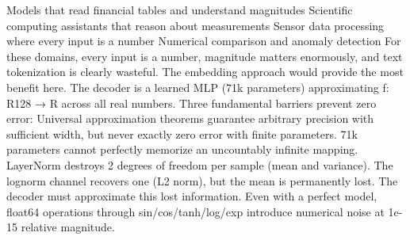 {}\markdownRendererUlBeginTight
\markdownRendererUlItem Models that read financial tables and understand magnitudes\markdownRendererUlItemEnd 
\markdownRendererUlItem Scientific computing assistants that reason about measurements\markdownRendererUlItemEnd 
\markdownRendererUlItem Sensor data processing where every input is a number\markdownRendererUlItemEnd 
\markdownRendererUlItem Numerical comparison and anomaly detection\markdownRendererUlItemEnd 
\markdownRendererUlEndTight \markdownRendererInterblockSeparator
{}For these domains, every input is a number, magnitude matters enormously, and text tokenization is clearly wasteful. The embedding approach would provide the most benefit here.\markdownRendererInterblockSeparator
{}\markdownRendererThematicBreak{}\markdownRendererInterblockSeparator
{}
\markdownRendererSectionEnd 
\markdownRendererSectionEnd \markdownRendererSectionBegin
{}\markdownRendererInterblockSeparator
{}\markdownRendererSectionBegin
{}\markdownRendererInterblockSeparator
{}The decoder is a learned MLP (71k parameters) approximating f: R\markdownRendererCircumflex{}128 → R across all real numbers. Three fundamental barriers prevent zero error:\markdownRendererInterblockSeparator
{}\markdownRendererOlBegin
{} Universal approximation theorems guarantee arbitrary precision with sufficient width, but never exactly zero error with finite parameters. 71k parameters cannot perfectly memorize an uncountably infinite mapping.\markdownRendererOlItemEnd 
{} LayerNorm destroys 2 degrees of freedom per sample (mean and variance). The log\markdownRendererUnderscore{}norm channel recovers one (L2 norm), but the mean is permanently lost. The decoder must approximate this lost information.\markdownRendererOlItemEnd 
{} Even with a perfect model, float64 operations through sin/cos/tanh/log/exp introduce numerical noise at \markdownRendererTilde{}1e-15 relative magnitude.\markdownRendererOlItemEnd 
\markdownRendererOlEnd \markdownRendererInterblockSeparator
{}
\markdownRendererSectionEnd \markdownRendererSectionBegin
{}\markdownRendererInterblockSeparator
